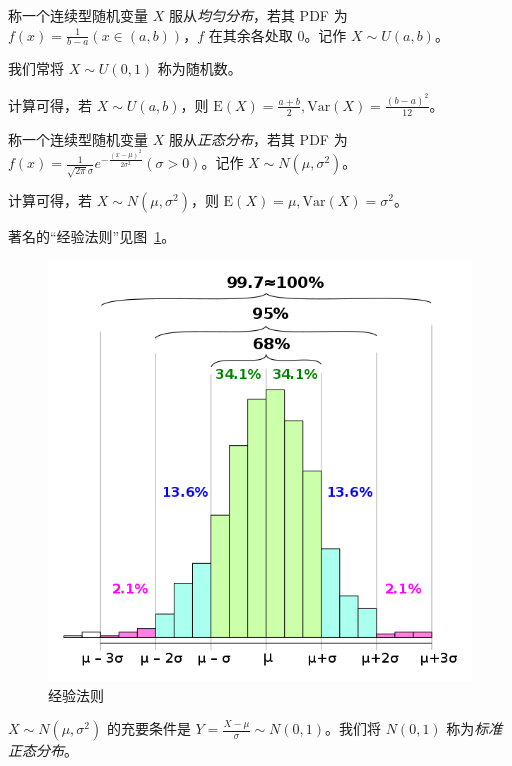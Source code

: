 \documentclass[../main.tex]{subfiles}
\begin{document}
\begin{definition}\label{def:2.5.1}
    称一个连续型随机变量 $X$ 服从\emph{均匀分布}，若其 PDF 为 $f(x)=\frac{1}{b-a}(x\in(a,b))$，$f$ 在其余各处取 $0$。记作 $X\sim U(a,b)$。
\end{definition}

我们常将 $X\sim U(0,1)$ 称为随机数。

计算可得，若 $X\sim U(a,b)$，则 $\mathrm{E}(X)=\frac{a+b}{2},\mathrm{Var}(X)=\frac{(b-a)^2}{12}$。

\begin{definition}\label{def:2.5.2}
    称一个连续型随机变量 $X$ 服从\emph{正态分布}，若其 PDF 为 $f(x)=\frac{1}{\sqrt{2\pi}\sigma}e^{-\frac{(x-\mu)^2}{2\sigma^2}}(\sigma>0)$。记作 $X\sim N(\mu,\sigma^2)$。
\end{definition}

计算可得，若 $X\sim N(\mu,\sigma^2)$，则 $\mathrm{E}(X)=\mu,\mathrm{Var}(X)=\sigma^2$。

著名的“经验法则”见图~\ref{fig:2.5.1}。

\begin{figure}[!h]
    \centering
    \includegraphics[scale=0.5]{figures/empirical_rule.png}
    \caption{经验法则}
    \label{fig:2.5.1}
\end{figure}

$X\sim N(\mu,\sigma^2)$ 的充要条件是 $Y=\frac{X-\mu}{\sigma}\sim N(0,1)$。我们将 $N(0,1)$ 称为\emph{标准正态分布}。
\end{document}
